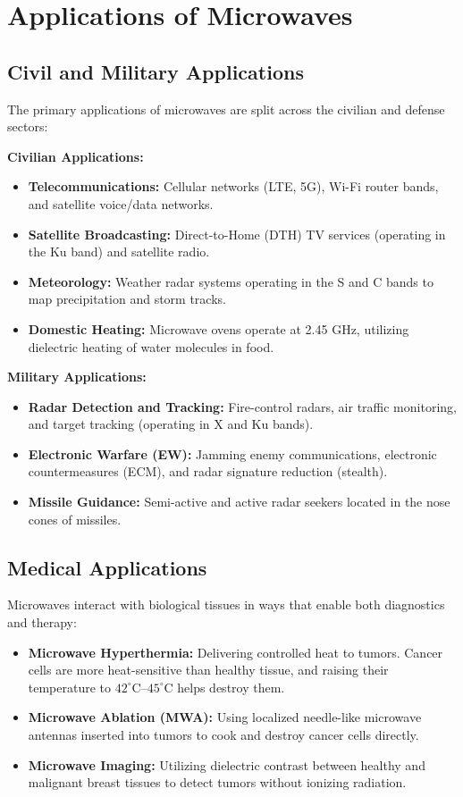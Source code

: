 \documentclass[12pt,a4paper]{article}
\begin{document}
\section{Applications of Microwaves}

\subsection{Civil and Military Applications}
The primary applications of microwaves are split across the civilian and defense sectors:

\textbf{Civilian Applications:}
\begin{itemize}[leftmargin=*, itemsep=2pt]
  \item \textbf{Telecommunications:} Cellular networks (LTE, 5G), Wi-Fi router bands, and satellite voice/data networks.
  \item \textbf{Satellite Broadcasting:} Direct-to-Home (DTH) TV services (operating in the Ku band) and satellite radio.
  \item \textbf{Meteorology:} Weather radar systems operating in the S and C bands to map precipitation and storm tracks.
  \item \textbf{Domestic Heating:} Microwave ovens operate at 2.45 GHz, utilizing dielectric heating of water molecules in food.
\end{itemize}

\textbf{Military Applications:}
\begin{itemize}[leftmargin=*, itemsep=2pt]
  \item \textbf{Radar Detection and Tracking:} Fire-control radars, air traffic monitoring, and target tracking (operating in X and Ku bands).
  \item \textbf{Electronic Warfare (EW):} Jamming enemy communications, electronic countermeasures (ECM), and radar signature reduction (stealth).
  \item \textbf{Missile Guidance:} Semi-active and active radar seekers located in the nose cones of missiles.
\end{itemize}

\subsection{Medical Applications}
Microwaves interact with biological tissues in ways that enable both diagnostics and therapy:
\begin{itemize}[leftmargin=*, itemsep=3pt]
  \item \textbf{Microwave Hyperthermia:} Delivering controlled heat to tumors. Cancer cells are more heat-sensitive than healthy tissue, and raising their temperature to $42^\circ\text{C}$--$45^\circ\text{C}$ helps destroy them.
  \item \textbf{Microwave Ablation (MWA):} Using localized needle-like microwave antennas inserted into tumors to cook and destroy cancer cells directly.
  \item \textbf{Microwave Imaging:} Utilizing dielectric contrast between healthy and malignant breast tissues to detect tumors without ionizing radiation.
\end{itemize}
\end{document}
